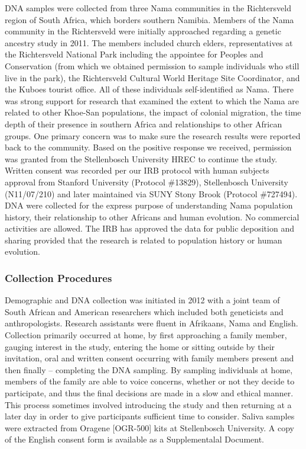 \documentclass[]{article}
\begin{document}
DNA samples were collected from three Nama communities in the Richtersveld
region of South Africa, which borders southern Namibia. Members of the Nama
community in the Richtersveld were initially approached regarding a genetic
ancestry study in 2011. The members included church elders, representatives at
the Richtersveld National Park including the appointee for Peoples and
Conservation (from which we obtained permission to sample individuals who still
live in the park), the Richtersveld Cultural World Heritage Site Coordinator,
and the Kuboes tourist office. All of these individuals self-identified as
Nama. There was strong support for research that examined the extent to which
the Nama are related to other Khoe-San populations, the impact of colonial
migration, the time depth of their presence in southern Africa and
relationships to other African groups. One primary concern was to make sure the
research results were reported back to the community. Based on the positive
response we received, permission was granted from the Stellenbosch University
HREC to continue the study. Written consent was recorded per our IRB protocol
with human subjects approval from Stanford University (Protocol \#13829),
Stellenbosch University (N11/07/210) and later maintained via SUNY Stony Brook
(Protocol \#727494). DNA were collected for the express purpose of understanding
Nama population history, their relationship to other Africans and human
evolution. No commercial activities are allowed. The IRB has approved the data
for public deposition and sharing provided that the research is related to
population history or human evolution.

\subsubsection{Collection Procedures}

Demographic and DNA collection was initiated in 2012 with a joint team of South
African and American researchers which included both geneticists and
anthropologists. Research assistants were fluent in Afrikaans, Nama and
English. Collection primarily occurred at home, by first approaching a family
member, gauging interest in the study, entering the home or sitting outside by
their invitation, oral and written consent occurring with family members
present and then finally -- completing the DNA sampling. By sampling
individuals at home, members of the family are able to voice concerns, whether
or not they decide to participate, and thus the final decisions are made in a
slow and ethical manner. This process sometimes involved introducing the study
and then returning at a later day in order to give participants sufficient time
to consider. Saliva samples were extracted from Oragene [OGR-500] kits at
Stellenbosch University. A copy of the English consent form is available as
a Supplementalal Document.
\end{document}

